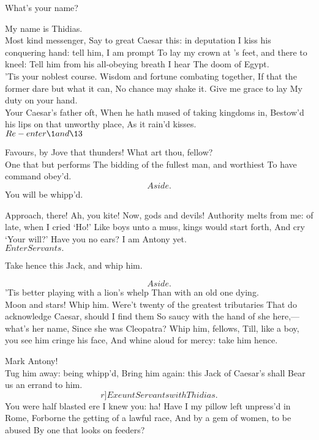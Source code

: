 \documentclass{book}
\begin{document}
\2	What's your name?

	My name is Thidias. \\

\2	Most kind messenger,
	Say to great Caesar this: in deputation
	I kiss his conquering hand: tell him, I am prompt
	To lay my crown at 's feet, and there to kneel:
	Tell him from his all-obeying breath I hear
	The doom of Egypt. \\

	'Tis your noblest course.
	Wisdom and fortune combating together,
	If that the former dare but what it can,
	No chance may shake it. Give me grace to lay
	My duty on your hand. \\

\2	Your Caesar's father oft,
	When he hath mused of taking kingdoms in,
	Bestow'd his lips on that unworthy place,
	As it rain'd kisses. \\

	\(Re-enter \1 and \13\)

\1	Favours, by Jove that thunders!
	What art thou, fellow? \\

	One that but performs
	The bidding of the fullest man, and worthiest
	To have command obey'd. \\

	\[Aside.\]               You will be whipp'd.

\1	Approach, there! Ah, you kite! Now, gods 	and devils!
	Authority melts from me: of late, when I cried `Ho!'
	Like boys unto a muss, kings would start forth,
	And cry `Your will?' Have you no ears? I am
	Antony yet. \\

	\(Enter Servants.\)

	Take hence this Jack, and whip him.

	\[Aside.\]  'Tis better playing with a lion's whelp
	Than with an old one dying. \\

\1	Moon and stars!
	Whip him. Were't twenty of the greatest tributaries
	That do acknowledge Caesar, should I find them
	So saucy with the hand of she here,---what's her name,
	Since she was Cleopatra? Whip him, fellows,
	Till, like a boy, you see him cringe his face,
	And whine aloud for mercy: take him hence.

	Mark Antony! \\


\1	                  Tug him away: being whipp'd,
	Bring him again: this Jack of Caesar's shall
	Bear us an errand to him.  \[r]Exeunt Servants with Thidias.\]
	You were half blasted ere I knew you: ha!
	Have I my pillow left unpress'd in Rome,
	Forborne the getting of a lawful race,
	And by a gem of women, to be abused
	By one that looks on feeders? \\
\end{document}
